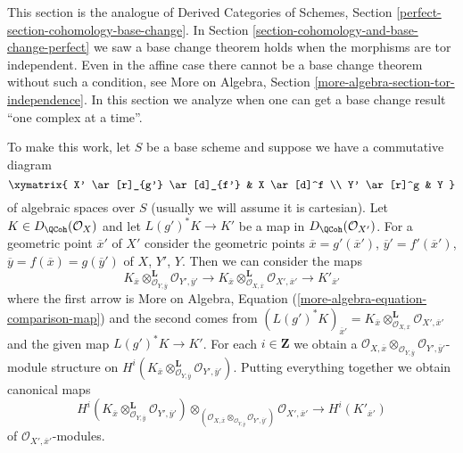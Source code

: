 \noindent
This section is the analogue of Derived Categories of Schemes, Section
\ref{perfect-section-cohomology-base-change}. In
Section \ref{section-cohomology-and-base-change-perfect}
we saw a base change theorem holds when the morphisms are tor independent.
Even in the affine case there cannot be a base change theorem without such
a condition, see
More on Algebra, Section \ref{more-algebra-section-tor-independence}.
In this section we analyze when one can get a base change result
``one complex at a time''.

\medskip\noindent
To make this work, let $S$ be a base scheme and
suppose we have a commutative diagram
$$
\xymatrix{
X' \ar[r]_{g'} \ar[d]_{f'} &
X \ar[d]^f \\
Y' \ar[r]^g &
Y
}
$$
of algebraic spaces over $S$ (usually we will assume it is cartesian).
Let $K \in D_\QCoh(\mathcal{O}_X)$
and let $L(g')^*K \to K'$ be a map in $D_\QCoh(\mathcal{O}_{X'})$.
For a geometric point $\overline{x}'$ of $X'$ consider the geometric
points
$\overline{x} = g'(\overline{x}')$,
$\overline{y}' = f'(\overline{x}')$,
$\overline{y} = f(\overline{x}) = g(\overline{y}')$
of $X$, $Y'$, $Y$.
Then we can consider the maps
$$
K_{\overline{x}}
\otimes_{\mathcal{O}_{Y, \overline{y}}}^\mathbf{L}
\mathcal{O}_{Y', \overline{y}'}
\to
K_{\overline{x}}
\otimes_{\mathcal{O}_{X, \overline{x}}}^\mathbf{L}
\mathcal{O}_{X', \overline{x}'} \to
K'_{\overline{x}'}
$$
where the first arrow is More on Algebra,
Equation (\ref{more-algebra-equation-comparison-map})
and the second comes from
$(L(g')^*K)_{\overline{x}'} =
K_{\overline{x}} \otimes_{\mathcal{O}_{X, \overline{x}}}^\mathbf{L}
\mathcal{O}_{X', \overline{x}'}$
and the given map $L(g')^*K \to K'$.
For each $i \in \mathbf{Z}$ we obtain a
$\mathcal{O}_{X, \overline{x}} \otimes_{\mathcal{O}_{Y, \overline{y}}}
\mathcal{O}_{Y', \overline{y}'}$-module structure on
$H^i(K_{\overline{x}}
\otimes_{\mathcal{O}_{Y, \overline{y}}}^\mathbf{L}
\mathcal{O}_{Y', \overline{y}'})$.
Putting everything together we obtain canonical maps
\begin{equation}
\label{equation-bc}
H^i(K_{\overline{x}}
\otimes_{\mathcal{O}_{Y, \overline{y}}}^\mathbf{L}
\mathcal{O}_{Y', \overline{y}'})
\otimes_{(\mathcal{O}_{X, \overline{x}}
\otimes_{\mathcal{O}_{Y, \overline{y}}}
\mathcal{O}_{Y', \overline{y}'})}
\mathcal{O}_{X', \overline{x}'}
\longrightarrow
H^i(K'_{\overline{x}'})
\end{equation}
of $\mathcal{O}_{X', \overline{x}'}$-modules.

